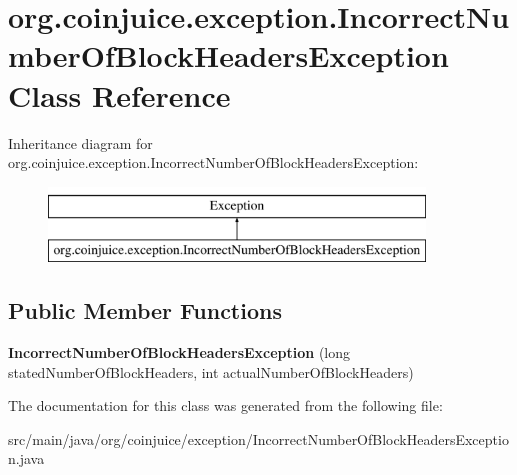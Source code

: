 \hypertarget{classorg_1_1coinjuice_1_1exception_1_1_incorrect_number_of_block_headers_exception}{\section{org.\-coinjuice.\-exception.\-Incorrect\-Number\-Of\-Block\-Headers\-Exception Class Reference}
\label{classorg_1_1coinjuice_1_1exception_1_1_incorrect_number_of_block_headers_exception}
}
Inheritance diagram for org.\-coinjuice.\-exception.\-Incorrect\-Number\-Of\-Block\-Headers\-Exception\-:\begin{figure}[H]
\begin{center}
\leavevmode
\includegraphics[height=2.000000cm]{classorg_1_1coinjuice_1_1exception_1_1_incorrect_number_of_block_headers_exception}
\end{center}
\end{figure}
\subsection*{Public Member Functions}
\begin{DoxyCompactItemize}
\item 
\hypertarget{classorg_1_1coinjuice_1_1exception_1_1_incorrect_number_of_block_headers_exception_acab43d77497a90f520253f7e1c3e21b5}{{\bfseries Incorrect\-Number\-Of\-Block\-Headers\-Exception} (long stated\-Number\-Of\-Block\-Headers, int actual\-Number\-Of\-Block\-Headers)}\label{classorg_1_1coinjuice_1_1exception_1_1_incorrect_number_of_block_headers_exception_acab43d77497a90f520253f7e1c3e21b5}

\end{DoxyCompactItemize}


The documentation for this class was generated from the following file\-:\begin{DoxyCompactItemize}
\item 
src/main/java/org/coinjuice/exception/Incorrect\-Number\-Of\-Block\-Headers\-Exception.\-java\end{DoxyCompactItemize}
